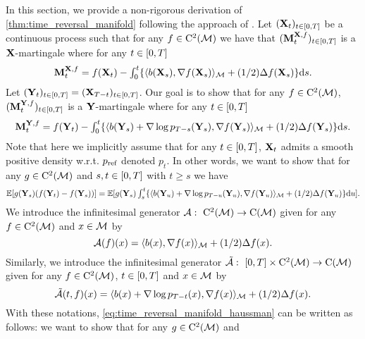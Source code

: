 In this section, we provide a non-rigorous derivation of
\cref{thm:time_reversal_manifold} following the approach of
\citet{haussmann1986time}. Let $(\mathbf{X}_t)_{t \in \left[0,T\right]}$ be a continuous
process such that for any $f \in \mathrm{C}^2(\mathcal M)$ we have that
$(\mathbf{M}_t^{\mathbf{X}, f})_{t \in \left[0,T\right]}$ is a $\mathbf{X}$-martingale where for any
$t \in \left[0,T\right]$
  \begin{equation}
    \label{eq:martingale_forward}
    \textstyle{ \mathbf{M}_t^{\mathbf{X}, f} = f(\mathbf{X}_t) - \int_0^t \{ \langle b(\mathbf{X}_s), \nabla f(\mathbf{X}_s) \rangle_\mathcal M+ (1/2) \Delta f(\mathbf{X}_s) \} \mathrm{d}s  . }
  \end{equation}
  Let $(\mathbf{Y}_t)_{t \in \left[0,T\right]} = (\mathbf{X}_{T-t})_{t \in \left[0,T\right]}$. Our goal is to show that for any $f \in \mathrm{C}^2(\mathcal M)$, 
  $(\mathbf{M}_t^{\mathbf{Y}, f})_{t \in \left[0,T\right]}$ is a $\mathbf{Y}$-martingale where for any
  $t \in \left[0,T\right]$
  \begin{equation}
    \textstyle{ \mathbf{M}_t^{\mathbf{Y}, f} = f(\mathbf{Y}_t) - \int_0^t \{ \langle b(\mathbf{Y}_s) + \nabla \log p_{T-s}(\mathbf{Y}_s), \nabla f(\mathbf{Y}_s) \rangle_\mathcal M+ (1/2) \Delta f(\mathbf{Y}_s) \} \mathrm{d}s  . }
  \end{equation}
  Note that here we implicitly assume that for any $t \in \left[0,T\right]$, $\mathbf{X}_t$
  admits a smooth positive density w.r.t. $p_{\textup{ref}}$ denoted $p_t$.  In other
  words, we want to show that for any $g \in \mathrm{C}^2(\mathcal M)$ and
  $s, t \in \left[0,T\right]$ with $t \geq s$ we have
  \begin{equation}
    \label{eq:time_reversal_manifold_haussman}    
    \textstyle{\mathbb{E}[ g(\mathbf{Y}_s)(f(\mathbf{Y}_t) - f(\mathbf{Y}_s)) ] = \mathbb{E}[ g(\mathbf{Y}_s)\int_s^t \{ \langle b(\mathbf{Y}_u) + \nabla \log p_{T-u}(\mathbf{Y}_u), \nabla f(\mathbf{Y}_u) \rangle_\mathcal M+ (1/2) \Delta f(\mathbf{Y}_u) \} \mathrm{d}u ]  . }
  \end{equation}
  We introduce the infinitesimal generator
  $\mathcal{A}: \  \mathrm{C}^2(\mathcal M) \to \mathrm{C}(\mathcal M)$ given for any $f \in \mathrm{C}^2(\mathcal M)$ and $x \in \mathcal M$ by
  \begin{equation}
    \mathcal{A} (f)(x) = \langle b(x) , \nabla f(x) \rangle_\mathcal M + (1/2) \Delta f(x)  . 
  \end{equation}
  Similarly, we introduce the infinitesimal generator
  $\tilde{\mathcal{A}}: \  \left[0,T\right] \times \mathrm{C}^2(\mathcal M) \to \mathrm{C}(\mathcal M)$ given for any $f \in \mathrm{C}^2(\mathcal M)$, $t \in \left[0,T\right]$ and $x \in \mathcal M$ by
  \begin{equation}
    \tilde{\mathcal{A}} (t, f)(x) = \langle b(x) + \nabla \log p_{T-t}(x), \nabla f(x) \rangle_\mathcal M + (1/2) \Delta f(x)  . 
  \end{equation}
  With these notations, \eqref{eq:time_reversal_manifold_haussman} can be written as follows:  we want to show that for any $g \in \mathrm{C}^2(\mathcal M)$ and
